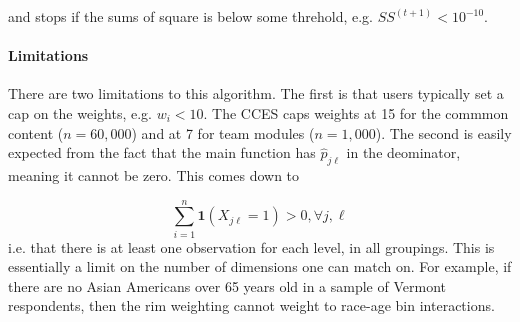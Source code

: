 \documentclass[11pt]{article}
\begin{document}
and stops if the sums of square is below some threhold, e.g. \(SS^{(t+1)} < 10^{-10}.\)


\paragraph{Limitations}
There are two limitations to this algorithm. The first is that users typically set a cap on the weights, e.g. \(w_{i} < 10\). The CCES caps weights at 15 for the commmon content (\(n = 60,000\)) and at 7 for team modules (\(n = 1,000\)). The second is easily expected from the fact that the main function has \(\widehat{p}_{j\ell}\) in the deominator, meaning it cannot be zero. This comes down to 

\[\sum^n_{i=1}\mathbf{1}(X_{j\ell} = 1) > 0, \forall j, \ell\]
i.e. that there is at least one observation for each level, in all groupings. This is essentially a limit on the number of dimensions one can match on. For example, if there are no Asian Americans over 65 years old in a sample of Vermont respondents, then the rim weighting cannot weight to race-age bin interactions.
\end{document}
